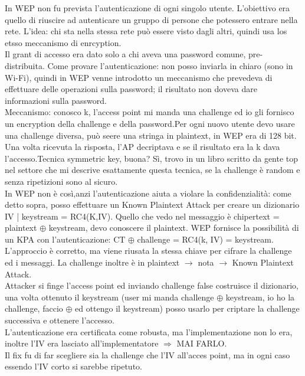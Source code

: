 \documentclass[16px]{article}
\begin{document}
In WEP non fu prevista l'autenticazione di ogni singolo utente. L'obiettivo era quello di riuscire ad autenticare un gruppo di persone che potessero entrare nella rete. L'idea: chi sta nella stessa rete può essere visto dagli altri, quindi usa los etsso meccanismo di enrcyption.\\ Il grant di accesso era dato solo a chi aveva una password comune, pre-distribuita. Come provare l'autenticazione: non posso inviarla in chiaro (sono in Wi-Fi), quindi in WEP venne introdotto un meccanismo che prevedeva di effettuare delle operazioni sulla password; il risultato non doveva dare informazioni sulla password.\\ Meccanismo: conosco k, l'access point mi manda una challenge ed io gli fornisco un encryption della challenge e della password.Per ogni nuovo utente devo usare una challenge diversa, può seere una stringa in plaintext, in WEP era di 128 bit. Una volta ricevuta la risposta, l'AP decriptava e se il risultato era la k dava l'accesso.Tecnica symmetric key, buona? Sì, trovo in un libro scritto da gente top nel settore che mi descrive esattamente questa tecnica, se la challenge è random e senza ripetizioni sono al sicuro.\\ In WEP non è così,anzi l'autenticazione aiuta a violare la confidenzialità: come detto sopra, posso effettuare un Known Plaintext Attack per creare un dizionario IV | keystream = RC4(K,IV). Quello che vedo nel messaggio è chipertext = plaintext $\oplus$ keystream, devo conoscere il plaintext. WEP fornisce la possibilità di un KPA con l'autenticazione: CT $\oplus$ challenge = RC4(k, IV) = keystream. L'approccio è corretto, ma viene riusata la stessa chiave per cifrare la challenge ed i messaggi. La challenge inoltre è in plaintext $\longrightarrow$ nota $\longrightarrow$ Known Plaintext Attack.\\ Attacker si finge l'access point ed inviando challenge false costruisce il dizionario, una volta ottenuto il keystream (user mi manda challenge $\oplus$ keystream, io ho la challenge, faccio $\oplus$ ed ottengo il keystream) posso usarlo per criptare la challenge successiva e ottenere l'accesso.\\ L'autenticazione era certificata come robusta, ma l'implementazione non lo era, inoltre l'IV era lasciato all'implementatore $\Rightarrow$ MAI FARLO.\\ Il fix fu di far scegliere sia la challenge che l'IV all'acces point, ma in ogni caso essendo l'IV corto si sarebbe ripetuto.
\end{document}
